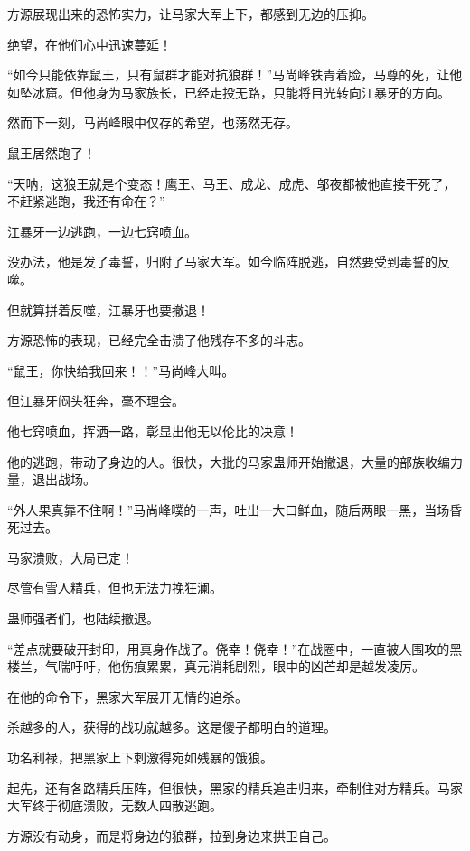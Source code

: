 
\begin{this_body}



方源展现出来的恐怖实力，让马家大军上下，都感到无边的压抑。

绝望，在他们心中迅速蔓延！

“如今只能依靠鼠王，只有鼠群才能对抗狼群！”马尚峰铁青着脸，马尊的死，让他如坠冰窟。但他身为马家族长，已经走投无路，只能将目光转向江暴牙的方向。

然而下一刻，马尚峰眼中仅存的希望，也荡然无存。

鼠王居然跑了！

“天呐，这狼王就是个变态！鹰王、马王、成龙、成虎、邬夜都被他直接干死了，不赶紧逃跑，我还有命在？”

江暴牙一边逃跑，一边七窍喷血。

没办法，他是发了毒誓，归附了马家大军。如今临阵脱逃，自然要受到毒誓的反噬。

但就算拼着反噬，江暴牙也要撤退！

方源恐怖的表现，已经完全击溃了他残存不多的斗志。

“鼠王，你快给我回来！！”马尚峰大叫。

但江暴牙闷头狂奔，毫不理会。

他七窍喷血，挥洒一路，彰显出他无以伦比的决意！

他的逃跑，带动了身边的人。很快，大批的马家蛊师开始撤退，大量的部族收编力量，退出战场。

“外人果真靠不住啊！”马尚峰噗的一声，吐出一大口鲜血，随后两眼一黑，当场昏死过去。

马家溃败，大局已定！

尽管有雪人精兵，但也无法力挽狂澜。

蛊师强者们，也陆续撤退。

“差点就要破开封印，用真身作战了。侥幸！侥幸！”在战圈中，一直被人围攻的黑楼兰，气喘吁吁，他伤痕累累，真元消耗剧烈，眼中的凶芒却是越发凌厉。

在他的命令下，黑家大军展开无情的追杀。

杀越多的人，获得的战功就越多。这是傻子都明白的道理。

功名利禄，把黑家上下刺激得宛如残暴的饿狼。

起先，还有各路精兵压阵，但很快，黑家的精兵追击归来，牵制住对方精兵。马家大军终于彻底溃败，无数人四散逃跑。

方源没有动身，而是将身边的狼群，拉到身边来拱卫自己。


\end{this_body}
